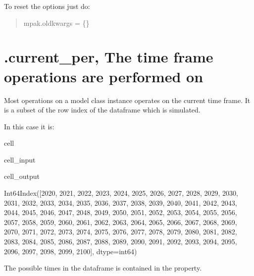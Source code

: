 \documentclass[letterpaper,10pt,english]{jupyterBook}
\begin{document}
\sphinxAtStartPar
To reset the options just do:
\begin{quote}

\sphinxAtStartPar
mpak.oldkwargs = \{\}
\end{quote}


\section{.current\_per, The time frame operations are performed on}
\label{\detokenize{content/Python/modelflow_features:current-per-the-time-frame-operations-are-performed-on}}
\sphinxAtStartPar
Most operations on a model class instance operates on the current time frame.
It is a subset of the row index of the dataframe which is simulated.

\sphinxAtStartPar
In this case it is:

\begin{sphinxuseclass}{cell}\begin{sphinxVerbatimInput}

\begin{sphinxuseclass}{cell_input}
\begin{sphinxVerbatim}[commandchars=\\\{\}]
\end{sphinxVerbatim}

\end{sphinxuseclass}\end{sphinxVerbatimInput}
\begin{sphinxVerbatimOutput}

\begin{sphinxuseclass}{cell_output}
\begin{sphinxVerbatim}[commandchars=\\\{\}]
Int64Index([2020, 2021, 2022, 2023, 2024, 2025, 2026, 2027, 2028, 2029, 2030,
            2031, 2032, 2033, 2034, 2035, 2036, 2037, 2038, 2039, 2040, 2041,
            2042, 2043, 2044, 2045, 2046, 2047, 2048, 2049, 2050, 2051, 2052,
            2053, 2054, 2055, 2056, 2057, 2058, 2059, 2060, 2061, 2062, 2063,
            2064, 2065, 2066, 2067, 2068, 2069, 2070, 2071, 2072, 2073, 2074,
            2075, 2076, 2077, 2078, 2079, 2080, 2081, 2082, 2083, 2084, 2085,
            2086, 2087, 2088, 2089, 2090, 2091, 2092, 2093, 2094, 2095, 2096,
            2097, 2098, 2099, 2100],
           dtype=\PYGZsq{}int64\PYGZsq{})
\end{sphinxVerbatim}

\end{sphinxuseclass}\end{sphinxVerbatimOutput}

\end{sphinxuseclass}
\sphinxAtStartPar
The possible times in the dataframe is contained in the  property.
\end{document}
